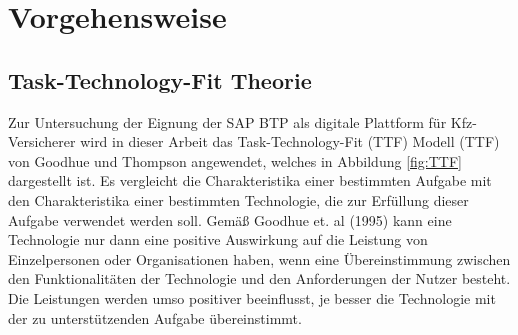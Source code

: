 \clearpage
\chapter{Vorgehensweise}
\section{Task-Technology-Fit Theorie}






Zur Untersuchung der Eignung der SAP BTP als digitale Plattform für Kfz-Versicherer wird in dieser Arbeit das Task-Technology-Fit (TTF) Modell (TTF) von Goodhue und Thompson angewendet, welches in Abbildung \ref{fig:TTF} dargestellt ist. Es vergleicht die Charakteristika einer bestimmten Aufgabe mit den Charakteristika einer bestimmten Technologie, die zur Erfüllung dieser Aufgabe verwendet werden soll. Gemäß Goodhue et. al (1995) kann eine Technologie nur dann eine positive Auswirkung auf die Leistung von Einzelpersonen oder Organisationen haben, wenn eine Übereinstimmung zwischen den Funktionalitäten der Technologie und den Anforderungen der Nutzer besteht. Die Leistungen werden umso positiver beeinflusst, je besser die Technologie mit der zu unterstützenden Aufgabe übereinstimmt.\autocite[Vgl.][S. 214-216]{GOODHUE1995}



